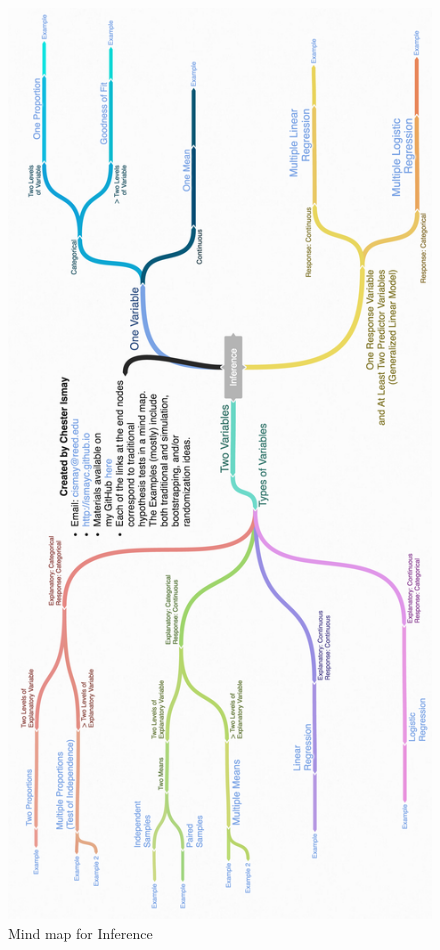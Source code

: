 \documentclass[12pt, krantz2,]{krantz}
\begin{document}
\begin{figure}

{\centering \includegraphics[width=2\linewidth]{images/coggle} 

}

\caption{Mind map for Inference}\label{fig:infer-map}
\end{figure}
\end{document}
